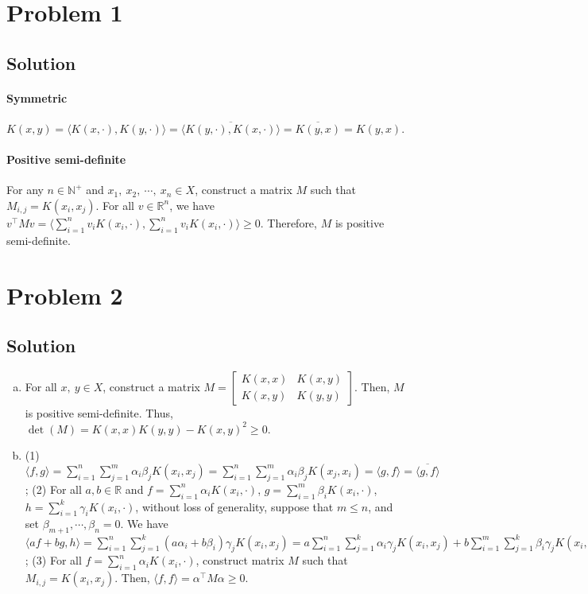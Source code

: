 \documentclass[11pt]{report}
\newcommand{\T}{\intercal}
\begin{document}

\section*{Problem 1}
\subsection*{Solution}
\paragraph{Symmetric} $K(x,y) = \langle K(x,\cdot), K(y,\cdot) \rangle = \overline{\langle K(y,\cdot), K(x,\cdot) \rangle} = \overline{K(y,x)} = K(y,x)$.
\paragraph{Positive semi-definite} For any $n \in \mathbb{N}^+$ and $x_1,\ x_2,\ \cdots,\ x_n \in X$, construct a matrix $M$ such that $M_{i,j} = K(x_i, x_j)$. For all $v \in \mathbb{R}^n$, we have $v^\T M v = \langle \sum_{i=1}^{n} v_i K(x_i, \cdot), \sum_{i=1}^{n} v_i K(x_i, \cdot) \rangle \geq 0$. Therefore, $M$ is positive semi-definite.

\section*{Problem 2}
\subsection*{Solution}
\begin{enumerate}[(a)]
  \item For all $x,\ y \in X$, construct a matrix $M = \begin{bmatrix}K(x,x) & K(x,y)\\ K(x,y) & K(y,y)\end{bmatrix}$. Then, $M$ is positive semi-definite. Thus, $\det (M) = K(x,x)K(y,y) - K(x,y)^2 \geq 0$.
  \item (1) $\langle f,g \rangle = \sum_{i=1}^{n}\sum_{j=1}^{m} \alpha_i \beta_j K(x_i, x_j) = \sum_{i=1}^{n}\sum_{j=1}^{m} \alpha_i \beta_j K(x_j, x_i) = \langle g,f \rangle = \overline{\langle g,f \rangle}$; (2) For all $a,b \in \mathbb{R}$ and $f = \sum_{i=1}^{n} \alpha_i K(x_i, \cdot)$, $g = \sum_{i=1}^{m} \beta_i K(x_i, \cdot)$, $h = \sum_{i=1}^{k} \gamma_i K(x_i, \cdot)$, without loss of generality, suppose that $m \leq n$, and set $\beta_{m+1},\cdots,\beta_{n} = 0$. We have $\langle af+bg, h \rangle = \sum_{i=1}^{n}\sum_{j=1}^{k} (a\alpha_i + b \beta_i)\gamma_j K(x_i, x_j) = a\sum_{i=1}^{n}\sum_{j=1}^{k} \alpha_i \gamma_j K(x_i, x_j) + b\sum_{i=1}^{m}\sum_{j=1}^{k} \beta_i \gamma_j K(x_i, x_j) = a \langle f,h \rangle + b \langle g,h \rangle$; (3) For all $f = \sum_{i=1}^{n} \alpha_i K(x_i, \cdot)$, construct matrix $M$ such that $M_{i,j} = K(x_i, x_j)$. Then, $\langle f,f \rangle = \alpha^\T M \alpha \geq 0$.
\end{enumerate}
\end{document}
